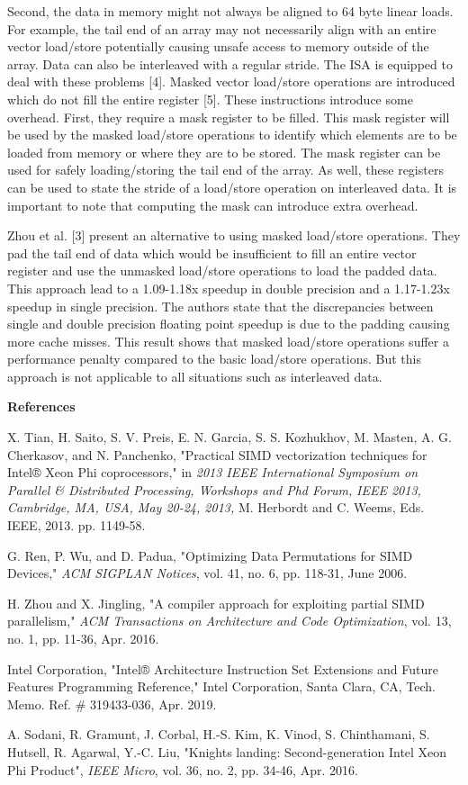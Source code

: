 \documentclass[12pt]{article}
\theoremstyle{definition}
\theoremstyle{remark}
\begin{document}
Second, the data in memory might not always be aligned to 64 byte linear loads. For example, the tail end of an array may not necessarily align with an entire vector load/store potentially causing unsafe access to memory outside of the array. Data can also be interleaved with a regular stride. The ISA is equipped to deal with these problems [4]. Masked vector load/store operations are introduced which do not fill the entire register [5]. These instructions introduce some overhead. First, they require a mask register to be filled. This mask register will be used by the masked load/store operations to identify which elements are to be loaded from memory or where they are to be stored. The mask register can be used for safely loading/storing the tail end of the array. As well, these registers can be used to state the stride of a load/store operation on interleaved data. It is important to note that computing the mask can introduce extra overhead. 

Zhou et al. [3] present an alternative to using masked load/store operations. They pad the tail end of data which would be insufficient to fill an entire vector register and use the unmasked load/store operations to load the padded data. This approach lead to a 1.09-1.18x speedup in double precision and a 1.17-1.23x speedup in single precision. The authors state that the discrepancies between single and double precision floating point speedup is due to the padding causing more cache misses. This result shows that masked load/store operations suffer a performance penalty compared to the basic load/store operations. But this approach is not applicable to all situations such as interleaved data.

\textbf{References}

\begin{enumerate}[label={[\arabic*]}]
	\item X. Tian, H. Saito, S. V. Preis, E. N. Garcia, S. S. Kozhukhov, M. Masten, A. G. Cherkasov, and N. Panchenko, "Practical SIMD vectorization techniques for Intel® Xeon Phi coprocessors," in \textit{2013 IEEE International Symposium on Parallel \& Distributed Processing, Workshops and Phd Forum,} \textit{IEEE 2013,} \textit{Cambridge, MA, USA, May 20-24, 2013,} M. Herbordt and C. Weems, Eds. IEEE, 2013. pp. 1149-58.
	\item G. Ren, P. Wu, and D. Padua, "Optimizing Data Permutations for SIMD Devices," \textit{ACM SIGPLAN Notices}, vol. 41, no. 6, pp. 118-31, June 2006.
	\item H. Zhou and X. Jingling, "A compiler approach for exploiting partial SIMD parallelism," \textit{ACM Transactions on Architecture and Code Optimization}, vol. 13, no. 1, pp. 11-36, Apr. 2016.
	\item Intel Corporation, "Intel® Architecture Instruction Set Extensions and Future Features Programming Reference," Intel Corporation, Santa Clara, CA, Tech. Memo. Ref. \# 319433-036, Apr. 2019.
	\item A. Sodani, R. Gramunt, J. Corbal, H.-S. Kim, K. Vinod, S. Chinthamani, S. Hutsell, R. Agarwal, Y.-C. Liu, "Knights landing: Second-generation Intel Xeon Phi Product", \textit{IEEE Micro}, vol. 36, no. 2, pp. 34-46, Apr. 2016.
\end{enumerate}
\end{document}
